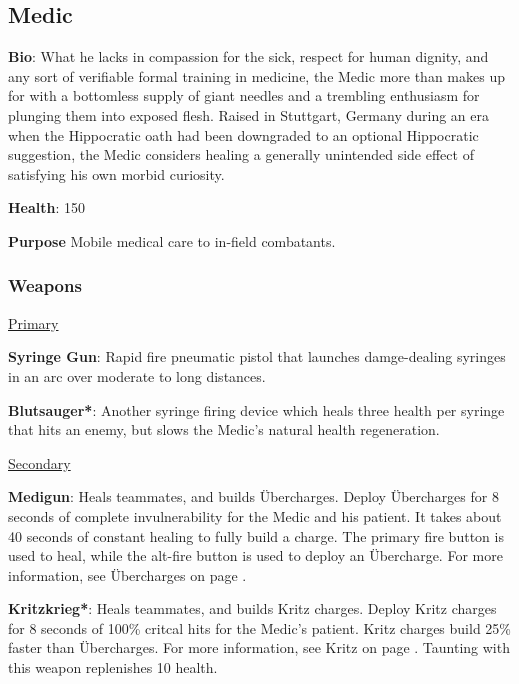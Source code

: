 \subsection{Medic}
\label{Medic}
{\bf Bio}:
What he lacks in compassion for the sick, respect for human dignity, and any sort of verifiable formal training in medicine, the Medic more than makes up for with a bottomless supply of giant needles and a trembling enthusiasm for plunging them into exposed flesh. Raised in Stuttgart, Germany during an era when the Hippocratic oath had been downgraded to an optional Hippocratic suggestion, the Medic considers healing a generally unintended side effect of satisfying his own morbid curiosity.

{\bf Health}: 150

{\bf Purpose}
Mobile medical care to in-field combatants.  

\subsubsection {Weapons}

\begin {center}
\underline {Primary}
\end {center}

{\bf Syringe Gun}: Rapid fire pneumatic pistol that launches damge-dealing syringes in an arc over moderate to long distances.

{\bf Blutsauger*}: Another syringe firing device which heals three health per syringe that hits an enemy, but slows the Medic's natural health regeneration. 


\begin {center}
\underline {Secondary}
\end {center}

{\bf Medigun}: Heals teammates, and builds Übercharges. Deploy Übercharges for 8 seconds of complete invulnerability for the Medic and his patient. It takes about 40 seconds of constant healing to fully build a charge. The primary fire button is used to heal, while the alt-fire button is used to deploy an Übercharge. For more information, see Übercharges on page \pageref{Ubercharge}. 

{\bf Kritzkrieg*}: Heals teammates, and builds Kritz charges. Deploy Kritz charges for 8 seconds of 100\% critcal hits for the Medic's patient. Kritz charges build 25\% faster than Übercharges.  For more information, see Kritz on page \pageref{Ubercharge}. Taunting with this weapon replenishes 10 health.


